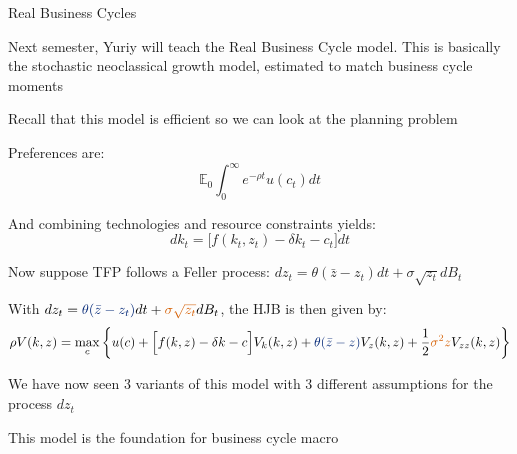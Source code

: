 \documentclass[11pt, aspectratio=169]{beamer}
\newenvironment{witemize}{\itemize\addtolength{\itemsep}{10pt}}{\enditemize}
\begin{document}
\begin{frame}{Real Business Cycles}
\begin{witemize}
\item Next semester, Yuriy will teach the Real Business Cycle model. This is basically the stochastic neoclassical growth model, estimated to match business cycle moments 

\item Recall that this model is efficient so we can look at the planning problem

\item Preferences are:
\begin{equation*}
	\mathbb E_0 \int_0^\infty e^{- \rho t} u(c_t) dt
\end{equation*}

\item And combining technologies and resource constraints yields:
\begin{equation*}
	dk_t = \Big[ f(k_t, z_t) - \delta k_t - c_t \Big] dt
\end{equation*}

\item Now suppose TFP follows a Feller process: $dz_t = \theta(\bar z - z_t) dt + \sigma \sqrt{z_t} dB_t$
\end{witemize}
\end{frame}


\begin{frame}{}
\begin{witemize}
\item With $dz_t = {\color{blue} \theta(\bar z - z_t) } dt + {\color{red} \sigma \sqrt{z_t} } dB_t$, the HJB is then given by:
\begin{equation*}
	\rho V(k, z) = \max_c \bigg\{ u(c) + \Big[ f(k, z) - \delta k - c \Big] V_k(k, z) + {\color{blue} \theta(\bar z - z) } V_z(k, z) + \frac{1}{2} {\color{red} \sigma^2 z } V_{zz}(k, z) \bigg\}
\end{equation*}

\item We have now seen 3 variants of this model with 3 different assumptions for the process $dz_t$

\item This model is the foundation for business cycle macro 
\end{witemize}
\end{frame}
\end{document}
